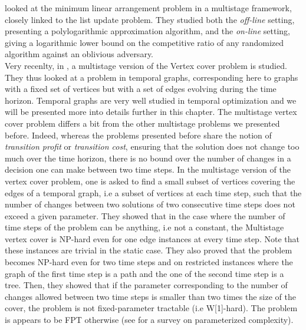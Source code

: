 \documentclass[a4paper]{book}
\begin{document}
\cite{olver2018itinerant} looked at the {\sc minimum linear arrangement} problem in a multistage framework, closely linked to the {\sc list update} problem. They studied both the \emph{off-line} setting, presenting a polylogarithmic approximation algorithm, and the  \emph{on-line} setting, giving a logarithmic lower bound on the competitive ratio of any randomized algorithm against an oblivious adversary. \\
Very recenlty, in \cite{fluschnik2019multistage}, a multistage version of the {\sc Vertex cover} problem is studied. They thus looked at a problem in temporal graphs, corresponding here to graphs with a fixed set of vertices but with a set of edges evolving during the time horizon. Temporal graphs are very well studied in temporal optimization and we will be presented more into details further in this chapter. The {\sc multistage vertex cover} problem differs a bit from the other multistage problems we presented before. Indeed, whereas the problems presented before share the notion of \textit{transition profit} or \textit{transition cost}, ensuring that the solution does not change too much over the time horizon, there is no bound over the number of changes in a decision one can make between two time steps. In the multistage version of the {\sc vertex cover} problem, one is asked to find a small subset of vertices covering the edges of a temporal graph, i.e a subset of vertices at each time step, such that the number of changes between two solutions of two consecutive time steps does not exceed a given parameter. They showed that in the case where the number of time steps of the problem can be anything, i.e not a constant, the {\sc Multistage vertex cover} is NP-hard even for one edge instances at every time step. Note that these instances are trivial in the static case. They also proved that the problem becomes NP-hard even for two time steps and on restricted instances where the graph of the first time step is a path and the one of the second time step is a tree. Then, they showed that if the parameter corresponding to the number of changes allowed between two time steps is smaller than two times the size of the cover, the problem is not fixed-parameter tractable (i.e W[1]-hard). The problem is appears to be FPT otherwise (see \cite{downey2012parameterized} for a survey on parameterized complexity). \\
\end{document}
